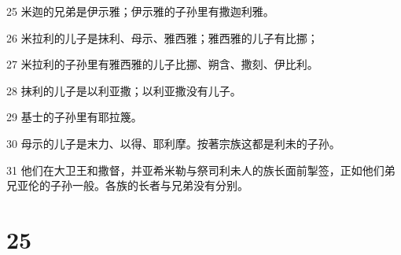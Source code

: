 \par 25 米迦的兄弟是伊示雅；伊示雅的子孙里有撒迦利雅。
\par 26 米拉利的儿子是抹利、母示、雅西雅；雅西雅的儿子有比挪；
\par 27 米拉利的子孙里有雅西雅的儿子比挪、朔含、撒刻、伊比利。
\par 28 抹利的儿子是以利亚撒；以利亚撒没有儿子。
\par 29 基士的子孙里有耶拉篾。
\par 30 母示的儿子是末力、以得、耶利摩。按著宗族这都是利未的子孙。
\par 31 他们在大卫王和撒督，并亚希米勒与祭司利未人的族长面前掣签，正如他们弟兄亚伦的子孙一般。各族的长者与兄弟没有分别。

\chapter{25}

